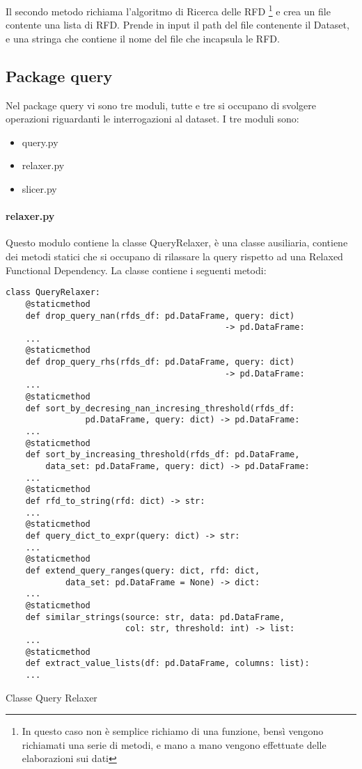 Il secondo metodo richiama l'algoritmo di Ricerca delle RFD \footnote{In questo caso non è semplice richiamo di una funzione, bensì vengono richiamati una serie di metodi, e mano a mano vengono effettuate delle elaborazioni sui dati} e crea un file contente una lista di RFD. Prende in input il path del file contenente il Dataset, e una stringa che contiene il nome del file che incapsula le RFD. 

\subsection{Package query}
Nel package query vi sono tre moduli, tutte e tre si occupano di svolgere operazioni riguardanti le interrogazioni al dataset.
I tre moduli sono:
\begin{itemize}[noitemsep]
\let\labelitemi\labelitemii
    \item query.py
    \item relaxer.py
    \item slicer.py
\end{itemize}

\paragraph{relaxer.py}
Questo modulo contiene la classe QueryRelaxer, è una classe ausiliaria, contiene dei metodi statici che si occupano di rilassare la query rispetto ad una Relaxed Functional Dependency. La classe contiene i seguenti metodi:

\begin{listing}[H]
\begin{verbatim}
class QueryRelaxer:
    @staticmethod
    def drop_query_nan(rfds_df: pd.DataFrame, query: dict) 
                                            -> pd.DataFrame:
    ...
    @staticmethod
    def drop_query_rhs(rfds_df: pd.DataFrame, query: dict)
                                            -> pd.DataFrame:
    ...
    @staticmethod
    def sort_by_decresing_nan_incresing_threshold(rfds_df: 
                pd.DataFrame, query: dict) -> pd.DataFrame:
    ...
    @staticmethod
    def sort_by_increasing_threshold(rfds_df: pd.DataFrame,
        data_set: pd.DataFrame, query: dict) -> pd.DataFrame:
    ...
    @staticmethod
    def rfd_to_string(rfd: dict) -> str:
    ...
    @staticmethod
    def query_dict_to_expr(query: dict) -> str:
    ...
    @staticmethod
    def extend_query_ranges(query: dict, rfd: dict, 
            data_set: pd.DataFrame = None) -> dict:
    ...
    @staticmethod
    def similar_strings(source: str, data: pd.DataFrame,
                        col: str, threshold: int) -> list:
    ...
    @staticmethod
    def extract_value_lists(df: pd.DataFrame, columns: list):
    ...
\end{verbatim}
\caption{Classe Query Relaxer}
\label{Code:10}
\end{listing}

